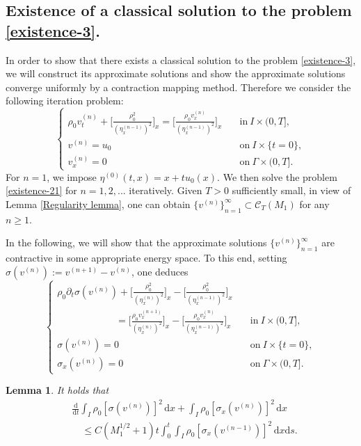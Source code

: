 \documentclass[11pt, reqno]{amsart}
\newcommand{\diff}{\mathrm{d}}
\newtheorem{lemma}{Lemma}
\numberwithin{equation}{section}
\begin{document}
{\subsection{Existence of a classical solution to the problem \eqref{existence-3}.}\label{classical solution}
In order to show that
there exists a classical solution to the problem \eqref{existence-3}, we will construct its approximate solutions and show the approximate solutions converge uniformly by a contraction mapping method. Therefore we consider the following iteration problem:
\begin{equation}\label{existence-21}
	\begin{cases}
		\rho_0v_t^{(n)}+\bigg[\frac{\rho_0^2}{(\eta_x^{(n-1)})^2}\bigg]_x
		=\bigg[\frac{\rho_0v_x^{(n)}}{(\eta_x^{(n-1)})^2}\bigg]_x &\quad \mbox{in}\ I\times (0,T],\\
		v^{(n)}=u_0 &\quad \mbox{on}\ I\times \{t=0\},\\
		v_x^{(n)}=0 &\quad \mbox{on}\ \Gamma\times (0,T].
	\end{cases}
\end{equation}
For \(n=1\), we impose 
\(\eta^{(0)}(t,x)=x+tu_0(x)\). We then solve the problem \eqref{existence-21} for \(n=1,2,...\) iteratively. 
Given \(T>0\) sufficiently small, 
in view of Lemma \ref{Regularity lemma}, one can obtain \(\{v^{(n)}\}_{n=1}^\infty\subset \mathcal{C}_T(M_1)\) for any \(n\geq 1\). 

In the following, we will show that the approximate solutions \(\{v^{(n)}\}_{n=1}^\infty\) 
are contractive in some appropriate energy space. To this end, 
setting \(\sigma(v^{(n)}):=v^{(n+1)}-v^{(n)}\), one deduces
\begin{equation}\label{existence-22}
	\begin{cases}
		\rho_0\partial_t\sigma(v^{(n)})+\bigg[\frac{\rho_0^2}{(\eta_x^{(n)})^2}\bigg]_x-\bigg[\frac{\rho_0^2}{(\eta_x^{(n-1)})^2}\bigg]_x\\
		\qquad\qquad\qquad=\bigg[\frac{\rho_0v_x^{(n+1)}}{(\eta_x^{(n)})^2}\bigg]_x
		-\bigg[\frac{\rho_0v_x^{(n)}}{(\eta_x^{(n-1)})^2}\bigg]_x &\quad \mbox{in}\ I\times (0,T],\\
	\sigma(v^{(n)})=0 &\quad \mbox{on}\ I\times \{t=0\},\\
	\sigma_x(v^{(n)})=0 &\quad \mbox{on}\ \Gamma\times (0,T].
	\end{cases}
\end{equation}


\begin{lemma} It holds that
	\begin{equation}\label{existence-23}
		\begin{aligned}
			&\frac{\diff}{\diff t}\int_I\rho_0[\sigma(v^{(n)})]^2\,\diff x
			+\int_I\rho_0[\sigma_x(v^{(n)})]^2\,\diff x\\
			&\quad\leq C(M_1^{1/2}+1)t\int_0^t\int_I\rho_0[\sigma_x(v^{(n-1)})]^2\,\diff x\diff s.
		\end{aligned}
	\end{equation}		
\end{lemma}


}
\end{document}
